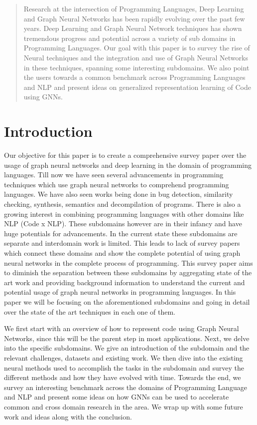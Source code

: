 \documentclass{article}
\begin{document}
\begin{abstract}
Research at the intersection of Programming Languages, Deep Learning and Graph Neural Networks has been rapidly evolving over the past few years. Deep Learning and Graph Neural Network techniques has shown tremendous progress and potential across a variety of sub domains in Programming Languages. Our goal with this paper is to survey the rise of Neural techniques and the integration and use of Graph Neural Networks in these techniques, spanning some interesting subdomains. We also point the users towards a common benchmark across Programming Languages and NLP and present ideas on generalized representation learning of Code using GNNs. 

\end{abstract}

\section{Introduction}
Our objective for this paper is to create a comprehensive survey paper over the usage of graph neural networks and deep learning in the domain of programming languages. Till now we have seen several advancements in programming techniques which use graph neural networks to comprehend programming languages. We have also seen works being done in bug detection, similarity checking, synthesis, semantics and decompilation of programs. There is also a growing interest in combining programming languages with other domains like NLP (Code x NLP). These subdomains however are in their infancy and have huge potentials for advancements. In the current state these subdomains are separate and interdomain work is limited. This leads to lack of survey papers which connect these domains and show the complete potential of using graph neural networks in the complete process of programming. This survey paper aims to diminish the separation between these subdomains by aggregating state of the art work and providing background information to understand the current and potential usage of graph neural networks in programming languages. In this paper we will be focusing on the aforementioned subdomains and going in detail over the state of the art techniques in each one of them. 

We first start with an overview of how to represent code using Graph Neural Networks, since this will be the parent step in most applications. Next, we delve into the specific subdomains. We give an introduction of the subdomain and the relevant challenges, datasets and existing work. We then dive into the existing neural methods used to accomplish the tasks in the subdomain and survey the different methods and how they have evolved with time. Towards the end, we survey an interesting benchmark across the domains of Programming Language and NLP and present some ideas on how GNNs can be used to accelerate common and cross domain research in the area. We wrap up with some future work and ideas along with the conclusion.
\end{document}
